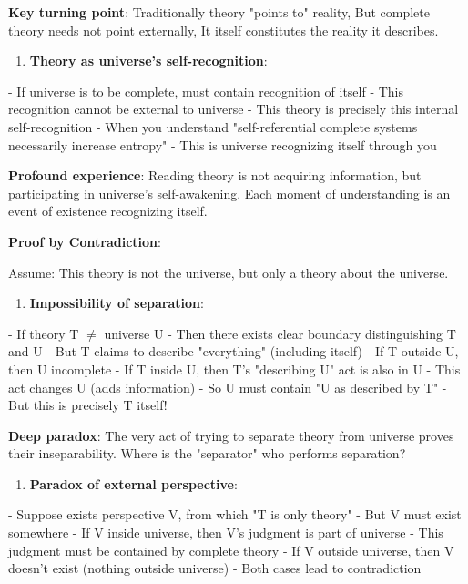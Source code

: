    \textbf{Key turning point}: Traditionally theory "points to" reality,
   But complete theory needs not point externally,
   It itself constitutes the reality it describes.

\begin{enumerate}
\item \textbf{Theory as universe's self-recognition}:
\end{enumerate}
   - If universe is to be complete, must contain recognition of itself
   - This recognition cannot be external to universe
   - This theory is precisely this internal self-recognition
   - When you understand "self-referential complete systems necessarily increase entropy"
   - This is universe recognizing itself through you
   
   \textbf{Profound experience}: Reading theory is not acquiring information,
   but participating in universe's self-awakening.
   Each moment of understanding is an event of existence recognizing itself.

\textbf{Proof by Contradiction}:

Assume: This theory is not the universe, but only a theory about the universe.

\begin{enumerate}
\item \textbf{Impossibility of separation}:
\end{enumerate}
   - If theory T $\neq$ universe U
   - Then there exists clear boundary distinguishing T and U
   - But T claims to describe "everything" (including itself)
   - If T outside U, then U incomplete
   - If T inside U, then T's "describing U" act is also in U
   - This act changes U (adds information)
   - So U must contain "U as described by T"
   - But this is precisely T itself!
   
   \textbf{Deep paradox}: The very act of trying to separate theory from universe
   proves their inseparability.
   Where is the "separator" who performs separation?

\begin{enumerate}
\item \textbf{Paradox of external perspective}:
\end{enumerate}
   - Suppose exists perspective V, from which "T is only theory"
   - But V must exist somewhere
   - If V inside universe, then V's judgment is part of universe
   - This judgment must be contained by complete theory
   - If V outside universe, then V doesn't exist (nothing outside universe)
   - Both cases lead to contradiction
   
